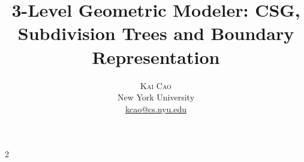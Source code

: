 \documentclass[twoside]{article}
\title{\vspace{-15mm}\fontsize{20pt}{10pt}\selectfont\textbf{3-Level Geometric Modeler: CSG, Subdivision Trees and Boundary Representation}} %
\author{
\large
\textsc{Kai Cao}\\[2mm] %
\normalsize New York University \\ %
\normalsize \href{mailto:kcao@cs.nyu.edu}{kcao@cs.nyu.edu} %
\vspace{-5mm}
}
\date{}
\begin{document}

\begin{multicols}{2} %

















\end{multicols}
\end{document}
